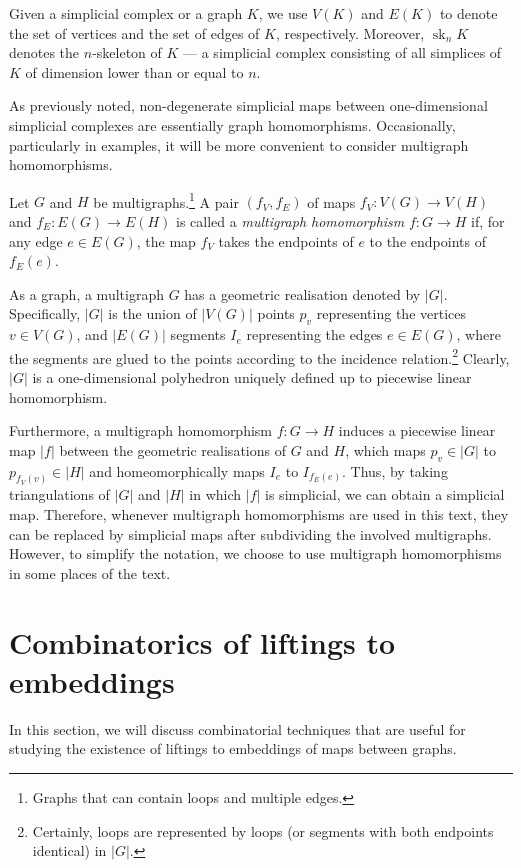 \documentclass[a4paper,12pt,reqno,oneside]{amsart}
\theoremstyle{plain}
\theoremstyle{definition}
\theoremstyle{plain}
\newcommand{\from}{\colon}
\DeclareMathOperator{\sk}{sk}
\begin{document}
Given a simplicial complex or a graph $K$, we use $V(K)$ and $E(K)$ to denote the set of vertices and
the set of edges of $K$, respectively. Moreover, $\sk_n K$ denotes the $n$-skeleton of $K$ --- a
simplicial complex consisting of all simplices of $K$ of dimension lower than or equal to $n$.

As previously noted, non-degenerate simplicial maps between one-dimensional simplicial complexes are
essentially graph homomorphisms. Occasionally, particularly in examples, it will be more convenient
to consider multigraph homomorphisms.

Let $G$ and $H$ be multigraphs.\footnote{Graphs that can contain loops and
  multiple edges.}  A pair $(f_V, f_E)$ of maps $f_V \from V(G) \to V(H)$ and
$f_E \from E(G) \to E(H)$ is called a \emph{multigraph homomorphism}
$f \from G \to H$ if, for any edge $e \in E(G)$, the map $f_V$ takes the endpoints of $e$ to the
endpoints of $f_E(e)$.

As a graph, a multigraph $G$ has a geometric realisation denoted by $|G|$. Specifically, $|G|$ is the
union of $|V(G)|$ points $p_{v}$ representing the vertices $v \in V(G)$, and $|E(G)|$ segments
$I_{e}$ representing the edges $e \in E(G)$, where the segments are glued to the points according to
the incidence relation.\footnote{Certainly, loops are represented by loops (or segments with
  both endpoints identical) in $|G|$.} Clearly, $|G|$ is a one-dimensional polyhedron uniquely
defined up to piecewise linear homomorphism.

Furthermore, a multigraph homomorphism $f \from G \to H$ induces a piecewise linear map $|f|$
between the geometric realisations of $G$ and $H$, which maps $p_{v} \in |G|$ to
$p_{f_{V}(v)} \in |H|$ and homeomorphically maps $I_{e}$ to $I_{f_{E}(e)}$. Thus, by taking
triangulations of $|G|$ and $|H|$ in which $|f|$ is simplicial, we can obtain a simplicial
map. Therefore, whenever multigraph homomorphisms are used in this text, they can be replaced by
simplicial maps after subdividing the involved multigraphs. However, to simplify the notation, we
choose to use multigraph homomorphisms in some places of the text.

\section{Combinatorics of liftings to embeddings}

In this section, we will discuss combinatorial techniques that are useful for studying the existence
of liftings to embeddings of maps between graphs.
\end{document}
